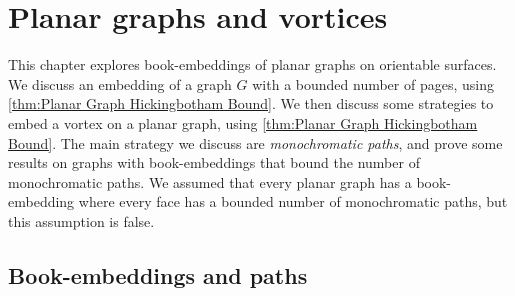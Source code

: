 \chapter{Planar graphs and vortices}\label{chap:planar}

This chapter explores book-embeddings of planar graphs on orientable surfaces. 
We discuss an embedding of a graph $G$ with a bounded number of pages, using \cref{thm:Planar Graph Hickingbotham Bound}. We then discuss some strategies to embed a vortex on a planar graph, using \cref{thm:Planar Graph Hickingbotham Bound}. The main strategy we discuss are \textit{monochromatic paths}, and prove some results on graphs with book-embeddings that bound the number of monochromatic paths. We assumed that every planar graph has a book-embedding where every face has a bounded number of monochromatic paths, but this assumption is false. 



\section{Book-embeddings and paths}

